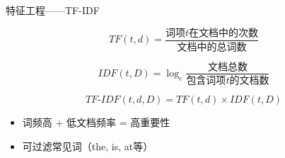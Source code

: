 \documentclass{beamer}
\begin{document}
\begin{frame}{特征工程——TF-IDF}
    \centering
    \begin{tcolorbox}[colback=white!98!black,
                      colframe=black!50,
                      width=0.9\textwidth,
                      arc=0mm,
                      boxsep=2pt]
        \begin{equation*}
            TF(t,d) = \frac{\text{词项}t\text{在文档中的次数}}{\text{文档中的总词数}}
        \end{equation*}
    \end{tcolorbox}
    
    \vspace{0.2cm}
    \begin{tcolorbox}[colback=green!10,
                      colframe=black!50,
                      width=0.9\textwidth,
                      arc=0mm,
                      boxsep=2pt]
        \begin{equation*}
            IDF(t,D) = \log_e\frac{\text{文档总数}}{\text{包含词项}t\text{的文档数}}
        \end{equation*}
    \end{tcolorbox}
    
    \vspace{0.2cm}
    \begin{tcolorbox}[colback=white!98!black,
                      colframe=black!50,
                      width=0.9\textwidth,
                      arc=0mm,
                      boxsep=2pt]
        \begin{equation*}
            TF\text{-}IDF(t,d,D) = TF(t,d) \times IDF(t,D)
        \end{equation*}
    \end{tcolorbox}
    
    \vspace{0.2cm}
    \begin{itemize}
        \item 词频高 + 低文档频率 = 高重要性
        \item 可过滤常见词（the, is, at等）
    \end{itemize}
\end{frame}
\end{document}
